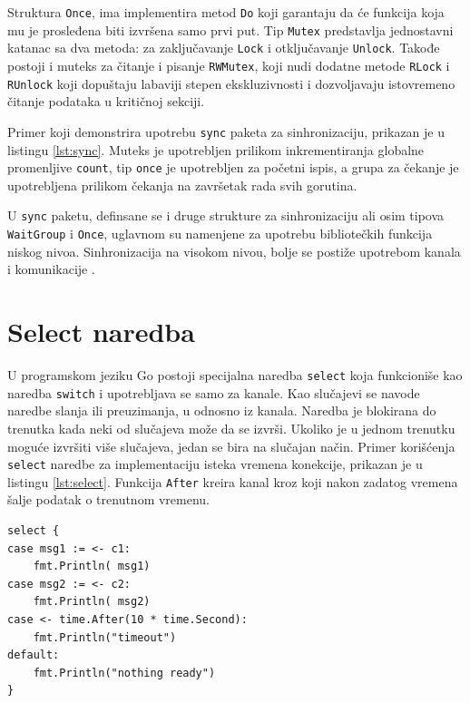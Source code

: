 \documentclass[12pt,oneside]{memoir}
\begin{document}
Struktura \texttt{Once}, ima implementira metod \texttt{Do} koji garantaju da će funkcija koja mu je prosleđena biti izvršena samo prvi put. Tip  \texttt{Mutex} predstavlja jednostavni katanac sa dva metoda: za zaključavanje \texttt{Lock} i otključavanje \texttt{Unlock}. Takođe postoji i muteks za čitanje i pisanje \texttt{RWMutex}, koji nudi dodatne metode \texttt{RLock} i \texttt{RUnlock} koji dopuštaju labaviji stepen ekskluzivnosti i dozvoljavaju istovremeno čitanje podataka u kritičnoj sekciji.

Primer koji demonstrira upotrebu \texttt{sync} paketa za sinhronizaciju, prikazan je u listingu \ref{lst:sync}. Muteks je upotrebljen prilikom inkrementiranja globalne promenljive \texttt{count}, tip \texttt{once} je upotrebljen za početni ispis, a grupa za čekanje je upotrebljena prilikom čekanja na završetak rada svih gorutina.

U \texttt{sync} paketu, definsane se i druge strukture za sinhronizaciju ali osim tipova \texttt{WaitGroup}  i \texttt{Once}, uglavnom su namenjene za upotrebu bibliotečkih funkcija niskog nivoa. Sinhronizacija na visokom nivou, bolje se postiže upotrebom kanala i komunikacije \cite{sync}. 

\section{Select naredba}

U programskom jeziku Go postoji specijalna naredba \texttt{select} koja funkcioniše kao naredba \texttt{switch} i upotrebljava se samo za kanale. Kao slučajevi se navode naredbe slanja ili preuzimanja, u odnosno iz kanala. Naredba je blokirana do trenutka kada neki od slučajeva može da se izvrši. Ukoliko je u jednom trenutku moguće izvršiti  više slučajeva, jedan se bira na slučajan način. Primer korišćenja \texttt{select} naredbe za implementaciju isteka vremena konekcije, prikazan je u listingu \ref{lst:select}. Funkcija \texttt{After} kreira kanal kroz koji nakon zadatog vremena šalje podatak o trenutnom vremenu.

\begin{center}
\begin{lstlisting}[caption=Primer upotrebe \texttt{select} naredbe, label={lst:select},  backgroundcolor=\color{background}]
select {
case msg1 := <- c1:
	fmt.Println( msg1)
case msg2 := <- c2:
	fmt.Println( msg2)
case <- time.After(10 * time.Second):
	fmt.Println("timeout")
default:
	fmt.Println("nothing ready")
}					
\end{lstlisting}
\end{center}
\end{document}
